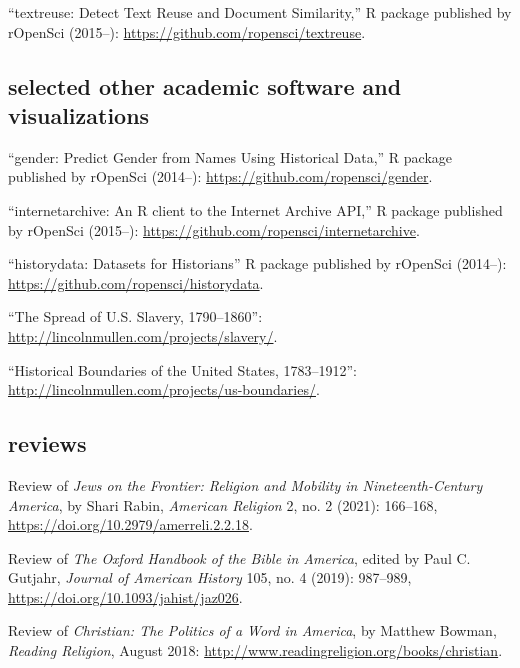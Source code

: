 \documentclass[11pt]{article}
\begin{document}
``textreuse: Detect Text Reuse and Document Similarity,'' R package published 
by rOpenSci (2015--): 
\url{https://github.com/ropensci/textreuse}.

\subsection{selected other academic software and visualizations}\label{other-academic-software}

``gender: Predict Gender from Names Using Historical Data,'' R package 
published by rOpenSci (2014--): \url{https://github.com/ropensci/gender}.

``internetarchive: An R client to the Internet Archive API,'' R package 
published by rOpenSci (2015--): 
\url{https://github.com/ropensci/internetarchive}.

``historydata: Datasets for Historians'' R package published by rOpenSci 
(2014--):  
\url{https://github.com/ropensci/historydata}.


``The Spread of U.S.  Slavery, 1790--1860'':  
\url{http://lincolnmullen.com/projects/slavery/}.

``Historical Boundaries of the United States, 1783--1912'': 
\url{http://lincolnmullen.com/projects/us-boundaries/}.



\subsection{reviews}\label{book-reviews}

Review of \emph{Jews on the Frontier: Religion and Mobility in Nineteenth-Century America}, by Shari Rabin, \emph{American Religion} 2, no. 2 (2021): 166--168, \url{https://doi.org/10.2979/amerreli.2.2.18}.

Review of \emph{The Oxford Handbook of the Bible in America}, edited by Paul 
C. Gutjahr, \emph{Journal of American History} 105, no. 4 (2019): 987--989, \url{https://doi.org/10.1093/jahist/jaz026}.

Review of \emph{Christian: The Politics of a Word in America}, by Matthew 
Bowman, \emph{Reading Religion}, August 2018: 
\url{http://www.readingreligion.org/books/christian}.
\end{document}
